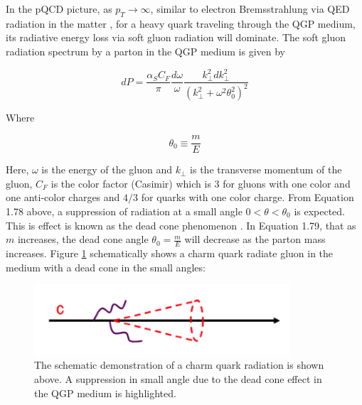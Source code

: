 
In the pQCD picture, as $p_T \rightarrow \infty$, similar to electron Bremsstrahlung via QED radiation in the matter \cite{Brems}, for a heavy quark traveling through the QGP medium, its radiative energy loss via soft gluon radiation will dominate. The soft gluon radiation spectrum by a parton in the QGP medium is given by \cite{DEADCONE}

\begin{equation}
dP = \frac{\alpha_S C_{F}}{\pi} \frac{d\omega}{\omega}\frac{k_{\perp}^2 dk_{\perp}^2}{(k_{\perp}^2  + \omega^2\theta_0^2)^2}
\end{equation}

Where 

\begin{equation}
\theta_0 \equiv \frac{m}{E}
\end{equation}

Here, $\omega$ is the energy of the gluon and $k_{\perp}$ is the transverse momentum of the gluon, $C_F$ is the color factor (Casimir) which is $3$ for gluons with one color and one anti-color charges and $4/3$ for quarks with one color charge. From Equation 1.78 above, a suppression of radiation at a small angle $0 < \theta < \theta_0$ is expected. This is effect is known as the dead cone phenomenon \cite{DEADCONE}. In Equation 1.79, that as $m$ increases, the dead cone angle $\theta_0 = \frac{m}{E}$ will decrease as the parton mass increases. Figure \ref{DeadConePic} schematically shows a charm quark radiate gluon in the medium with a dead cone in the small angles:

 \begin{figure}[hbtp]
\begin{center}
\includegraphics[width=0.85\textwidth]{Figures/Chapter1/CharmDeadCone.png}
\caption{The schematic demonstration of a charm quark radiation is shown above. A suppression in small angle due to the dead cone effect in the QGP medium is highlighted.}
\label{DeadConePic}
\end{center}
\end{figure}  

